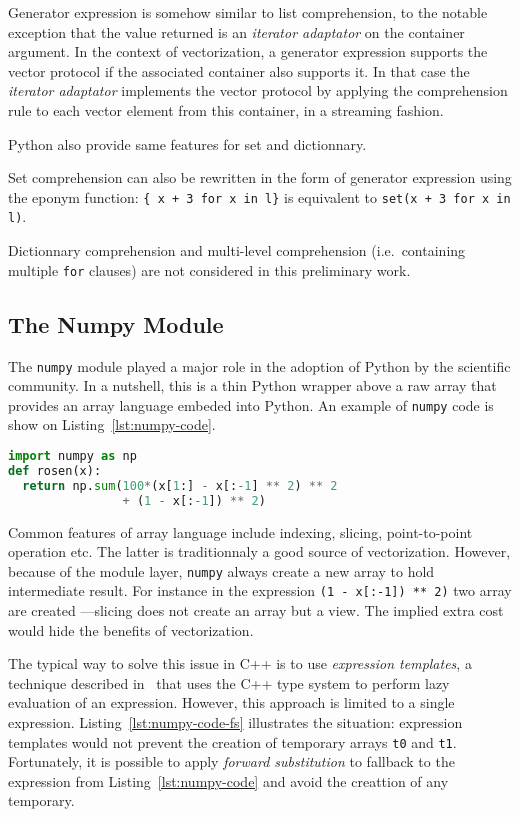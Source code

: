\documentclass[preprint]{sigplanconf}
\begin{document}
Generator expression is somehow similar to list comprehension, to the notable
exception that the value returned is an \emph{iterator adaptator} on the
container argument. In the context of vectorization, a generator expression
supports the vector protocol if the associated container also supports it. In
that case the  \emph{iterator adaptator} implements the vector protocol by
applying the comprehension rule to each vector element from this container, in a
streaming fashion.

Python also provide same features for set and dictionnary.

Set comprehension can also be rewritten in the form of
generator expression using the eponym function: \texttt{\{ x + 3 for x in l\}}
is equivalent to \texttt{set(x + 3 for x in l)}.

Dictionnary comprehension and multi-level comprehension (i.e.\ containing
multiple \texttt{for} clauses) are not considered in this preliminary work.

\subsection{The Numpy Module}

The \texttt{numpy} module played a major role in the adoption of Python by the
scientific community. In a nutshell, this is a thin Python wrapper above a raw
array that provides an array language embeded into Python. An example of
\texttt{numpy} code is show on Listing~\ref{lst:numpy-code}.

\begin{lstlisting}[language=python, label={lst:numpy-code}, caption={Sample \texttt{numpy} code.}]
import numpy as np
def rosen(x):
  return np.sum(100*(x[1:] - x[:-1] ** 2) ** 2
                + (1 - x[:-1]) ** 2)
\end{lstlisting}

Common features of array language include indexing, slicing, point-to-point
operation etc. The latter is traditionnaly a good source of vectorization.
However, because of the module layer, \texttt{numpy} always create a new array
to hold intermediate result. For instance in the expression \texttt{(1 -
x[:-1]) ** 2)} two array are created ---slicing does not create an array but a
view. The implied extra cost would hide the benefits of vectorization.

The typical way to solve this issue in C++ is to use \emph{expression
templates}, a technique described in~\cite{} that uses the C++ type system to
perform lazy evaluation of an expression. However, this approach is limited to
a single expression. Listing~\ref{lst:numpy-code-fs} illustrates the situation:
expression templates would not prevent the creation of temporary arrays
\texttt{t0} and \texttt{t1}. Fortunately, it is possible to apply \emph{forward
substitution} to fallback to the expression from Listing~\ref{lst:numpy-code}
and avoid the creattion of any temporary.
\end{document}
